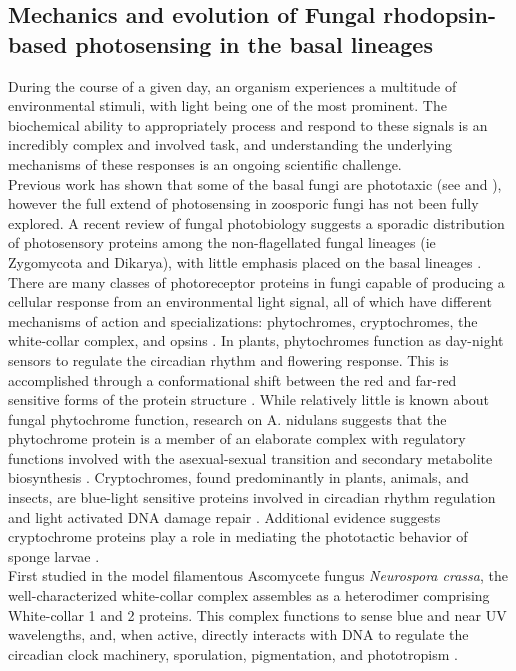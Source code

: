 \subsection*{Mechanics and evolution of Fungal rhodopsin-based photosensing in the basal lineages}
\indent During the course of a given day, an organism experiences a multitude of environmental stimuli, with light being one of the most prominent. The biochemical ability to appropriately process and respond to these signals is an incredibly complex and involved task, and understanding the underlying mechanisms of these responses is an ongoing scientific challenge. \\
\indent Previous work has shown that some of the basal fungi are phototaxic (see \cite{Saranak1997} and \cite{Muehlstein1987}), however the full extend of photosensing in zoosporic fungi has not been fully explored. A recent review of fungal photobiology suggests a sporadic distribution of photosensory proteins among the non-flagellated fungal lineages (ie Zygomycota and Dikarya), with little emphasis placed on the basal lineages \cite{Idnurm2010}. There are many classes of photoreceptor proteins in fungi capable of producing a cellular response from an environmental light signal, all of which have different mechanisms of action and specializations: phytochromes, cryptochromes, the white-collar complex, and opsins \cite{Idnurm2010}. In plants, phytochromes function as day-night sensors to regulate the circadian rhythm and flowering response. This is accomplished through a conformational shift between the red and far-red sensitive forms of the protein structure \cite{Rockwell2006}. While relatively little is known about fungal phytochrome function, research on A. nidulans suggests that the phytochrome protein is a member of an elaborate complex with regulatory functions involved with the asexual-sexual transition and secondary metabolite biosynthesis \cite{Idnurm2010}. Cryptochromes, found predominantly in plants, animals, and insects, are blue-light sensitive proteins involved in circadian rhythm regulation and light activated DNA damage repair \cite{Idnurm2010}. Additional evidence suggests cryptochrome proteins play a role in mediating the phototactic behavior of sponge larvae \cite{Rivera2012}.\\
\indent First studied in the model filamentous Ascomycete fungus \textit{Neurospora crassa}, the well-characterized white-collar complex assembles as a heterodimer comprising White-collar 1 and 2 proteins. This complex functions to sense blue and near UV wavelengths, and, when active, directly interacts with DNA to regulate the circadian clock machinery, sporulation, pigmentation, and phototropism \cite{Ballario1997,Purschwitz2006,Corrochano2007}. \\
